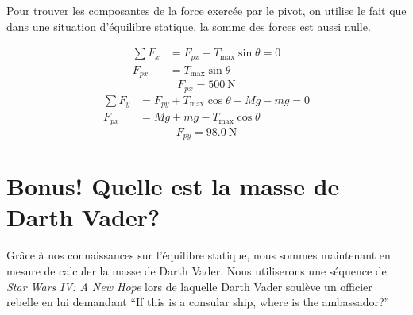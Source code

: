 \documentclass{tufte-handout}
\begin{document}
Pour trouver les composantes de la force exercée par le pivot, on utilise le
fait que dans une situation d'équilibre statique, la somme des forces est aussi
nulle.
\begin{marginfigure}
  \begin{center}
  \end{center}
\end{marginfigure}
\begin{align*}
  \sum F_x &= F_{px} - T_\mathrm{max} \sin\theta = 0 \\
  F_{px} &= T_\mathrm{max} \sin\theta
\end{align*}
\begin{equation*}
  \boxed{F_{px} = \SI{500}{\newton}}
\end{equation*}
\begin{align*}
  \sum F_y &= F_{py} + T_\mathrm{max} \cos\theta - Mg - mg = 0 \\
  F_{px} &= Mg + mg - T_\mathrm{max} \cos\theta
\end{align*}
\begin{equation*}
  \boxed{F_{py} = \SI{98.0}{\newton}}
\end{equation*}


\section{\textbf{Bonus!} Quelle est la masse de Darth Vader?}

Grâce à nos connaissances sur l'équilibre statique, nous sommes maintenant en
mesure de calculer la masse de Darth Vader. Nous utiliserons une séquence de
\textit{Star Wars IV: A New Hope} lors de laquelle Darth Vader soulève un
officier rebelle en lui demandant ``If this is a consular ship, where is the
ambassador?''
\end{document}
